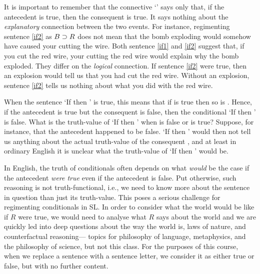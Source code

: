 It is important to remember that the connective `\eif' says only that, if the antecedent is true, then the consequent is true.
It says nothing about the \emph{explanatory} connection between the two events.
For instance, regimenting sentence \ref{if2} as $B \supset R$ does not mean that the bomb exploding would somehow have caused your cutting the wire.
Both sentence \ref{if1} and \ref{if2} suggest that, if you cut the red wire, your cutting the red wire would explain why the bomb exploded.
They differ on the \emph{logical} connection.
If sentence \ref{if2} were true, then an explosion would tell us that you had cut the red wire.
Without an explosion, sentence \ref{if2} tells us nothing about what you did with the red wire.



When the sentence `If \metaA{} then \metaB{}' is true, this means that if \metaA{} is true then so is \metaB{}.
Hence, if the antecedent \metaA{} is true but the consequent \metaB{} is false, then the conditional `If \metaA{} then \metaB{}' is false.
What is the truth-value of `If \metaA{} then \metaB{}' when \metaA{} is false or \metaB{} is true?
Suppose, for instance, that the antecedent \metaA{} happened to be false.
`If \metaA{} then \metaB{}' would then not tell us anything about the actual truth-value of the consequent \metaB{}, and at least in ordinary English it is unclear what the truth-value of `If \metaA{} then \metaB{}' would be. 

In English, the truth of conditionals often depends on what \emph{would} be the case if the antecedent \emph{were true} even if the antecedent is false.
Put otherwise, such reasoning is not truth-functional, i.e., we need to know more about the sentence in question than just its truth-value.
This poses a serious challenge for regimenting conditionals in SL.
In order to consider what the world would be like if $R$ were true, we would need to analyse what $R$ says about the world and we are quickly led into deep questions about the way the world is, laws of nature, and counterfactual reasoning--- topics for philosophy of language, metaphysics, and the philosophy of science, but not this class.
For the purposes of this course, when we replace a sentence with a sentence letter, we consider it as either true or false, but with no further content.

